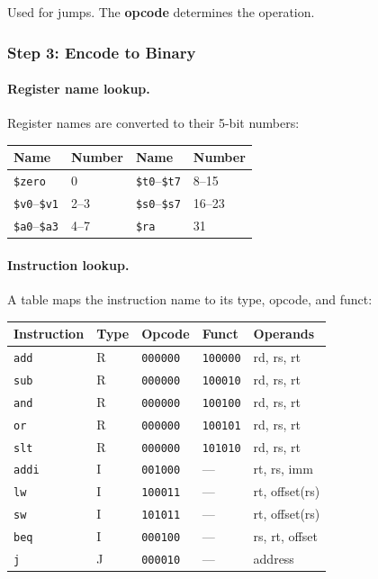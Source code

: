 Used for jumps. The \textbf{opcode} determines the operation.

\subsubsection{Step 3: Encode to Binary}

\paragraph{Register name lookup.}
Register names are converted to their 5-bit numbers:

\begin{center}
\begin{tabular}{llll}
  \toprule
  \textbf{Name} & \textbf{Number} &
  \textbf{Name} & \textbf{Number} \\
  \midrule
  \texttt{\$zero} & 0  & \texttt{\$t0}--\texttt{\$t7} & 8--15 \\
  \texttt{\$v0}--\texttt{\$v1} & 2--3 & \texttt{\$s0}--\texttt{\$s7} & 16--23 \\
  \texttt{\$a0}--\texttt{\$a3} & 4--7 & \texttt{\$ra} & 31 \\
  \bottomrule
\end{tabular}
\end{center}

\paragraph{Instruction lookup.}
A table maps the instruction name to its type, opcode, and funct:

\begin{center}
\begin{tabular}{lllll}
  \toprule
  \textbf{Instruction} & \textbf{Type} & \textbf{Opcode} & \textbf{Funct} & \textbf{Operands} \\
  \midrule
  \texttt{add}  & R & \texttt{000000} & \texttt{100000} & rd, rs, rt \\
  \texttt{sub}  & R & \texttt{000000} & \texttt{100010} & rd, rs, rt \\
  \texttt{and}  & R & \texttt{000000} & \texttt{100100} & rd, rs, rt \\
  \texttt{or}   & R & \texttt{000000} & \texttt{100101} & rd, rs, rt \\
  \texttt{slt}  & R & \texttt{000000} & \texttt{101010} & rd, rs, rt \\
  \midrule
  \texttt{addi} & I & \texttt{001000} & ---             & rt, rs, imm \\
  \texttt{lw}   & I & \texttt{100011} & ---             & rt, offset(rs) \\
  \texttt{sw}   & I & \texttt{101011} & ---             & rt, offset(rs) \\
  \texttt{beq}  & I & \texttt{000100} & ---             & rs, rt, offset \\
  \midrule
  \texttt{j}    & J & \texttt{000010} & ---             & address \\
  \bottomrule
\end{tabular}
\end{center}

